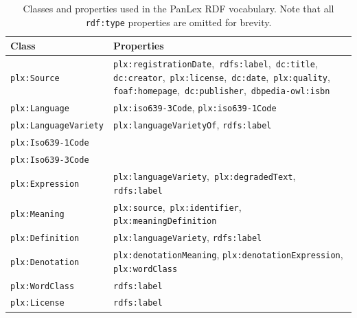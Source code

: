 \documentclass[sw]{iosart2c}
\begin{document}
\begin{table}
  \begin{tiny}
  \begin{tabular}{p{52px}p{140px}}
    Class                 & Properties \\
    \toprule
    \texttt{plx:Source} & \mbox{\texttt{plx:registrationDate}, \texttt{rdfs:label}, \texttt{dc:title},}
                            \mbox{\texttt{dc:creator}, \texttt{plx:license}, \texttt{dc:date}, \texttt{plx:quality},}
                            \mbox{\texttt{foaf:homepage}, \texttt{dc:publisher}, \texttt{dbpedia-owl:isbn}} \\
    \midrule
    \texttt{plx:Language} & \texttt{plx:iso639-3Code}, \texttt{plx:iso639-1Code} \\
    \midrule
    \texttt{plx:LanguageVariety}
                          & \texttt{plx:languageVarietyOf}, \texttt{rdfs:label} \\
    \midrule
    \texttt{plx:Iso639-1Code} & \\
    \midrule
    \texttt{plx:Iso639-3Code} & \\
    \midrule
    \texttt{plx:Expression}
                          & \mbox{\texttt{plx:languageVariety}, \texttt{plx:degradedText},} \texttt{rdfs:label} \\
    \midrule
    \texttt{plx:Meaning}
                          & \mbox{\texttt{plx:source}, \texttt{plx:identifier},} \texttt{plx:meaningDefinition} \\
    \midrule
    \texttt{plx:Definition}
                          & \texttt{plx:languageVariety}, \texttt{rdfs:label} \\
    \midrule
    \texttt{plx:Denotation}
                          & \texttt{plx:denotationMeaning}, \texttt{plx:denotationExpression}, \texttt{plx:wordClass} \\
    \midrule
    \texttt{plx:WordClass}  
                          & \texttt{rdfs:label} \\
    \midrule
    \texttt{plx:License}  & \texttt{rdfs:label} \\
    \bottomrule
  \end{tabular}
  \end{tiny}
  \caption{Classes and properties used in the PanLex RDF vocabulary. Note that all \texttt{rdf:type} properties are omitted for brevity.}
  \label{tbl:vocabulary}
\end{table}
\end{document}
